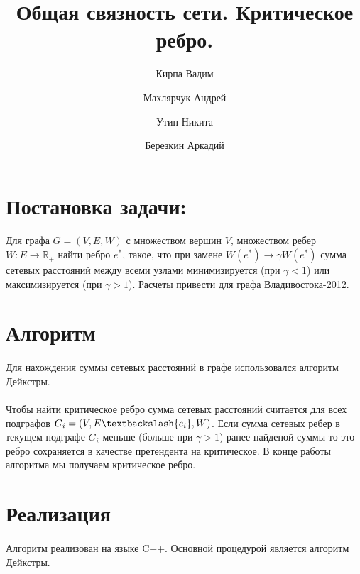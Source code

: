 \documentclass[12pt]{article}
\begin{document}
\title{Общая связность сети. Критическое ребро.}

\author{
  Кирпа Вадим
  \and
  Махлярчук Андрей
  \and
  Утин Никита
  \and
  Березкин Аркадий
}

\maketitle
\thispagestyle{empty}
\newpage

\section{Постановка задачи:}

\paragraph{}
Для графа $G = (V, E, W)$ с множеством вершин $V$,
множеством ребер $W: E \rightarrow \mathbb{R}_+$
найти ребро $e^*$, такое, что при замене
$W(e^*) \rightarrow \gamma W(e^*)$ сумма сетевых
расстояний между всеми узлами минимизируется
(при $\gamma < 1$) или максимизируется (при $\gamma > 1$).
Расчеты привести для графа Владивостока-2012.

\section{Алгоритм}

\paragraph{}
Для нахождения суммы сетевых расстояний в графе использовался
алгоритм Дейкстры\cite{dijkstra}.

\paragraph{}
Чтобы найти критическое ребро сумма сетевых расстояний считается
для всех подграфов $G_i = (V, E\textbackslash \{e_i \}, W)$. Если сумма сетевых
ребер в текущем подграфе $G_i$ меньше (больше при $\gamma > 1$)
ранее найденой суммы то это ребро сохраняется в качестве претендента
на критическое. В конце работы алгоритма мы получаем критическое ребро.

\section{Реализация}

\paragraph{}
Алгоритм реализован на языке C++. Основной процедурой является
алгоритм Дейкстры\cite{dijkstra}.
\end{document}
